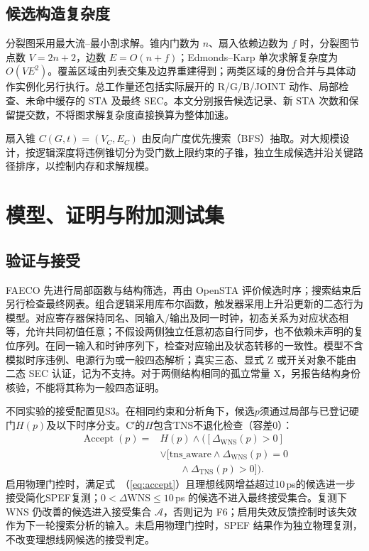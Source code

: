 \documentclass[twocolumn,10pt,fontset=windows]{ctexart}
\renewcommand{\eqref}[1]{\textup{（\ref{#1}）}}
\begin{document}
\subsection{候选构造复杂度}\label{sec:impl}

分裂图采用最大流--最小割求解。锥内门数为 $n$、扇入依赖边数为 $f$ 时，分裂图节点数 $V=2n+2$，边数 $E=O(n+f)$；Edmonds--Karp 单次求解复杂度为 $O(VE^2)$。覆盖区域由列表交集及边界重建得到；两类区域的身份合并与具体动作实例化另行执行。总工作量还包括实际展开的 R/G/B/JOINT 动作、局部检查、未命中缓存的 STA 及最终 SEC。本文分别报告候选记录、新 STA 次数和保留提交数，不将图求解复杂度直接换算为整体加速。

扇入锥 $C(G, t) = (V_C, E_C)$ 由反向广度优先搜索（BFS）抽取。对大规模设计，按逻辑深度将违例锥切分为受门数上限约束的子锥，独立生成候选并沿关键路径排序，以控制内存和求解规模。

\section{模型、证明与附加测试集}\label{sec:exp}
\subsection{验证与接受}\label{sec:validation}
FAECO 先进行局部函数与结构筛选，再由 OpenSTA 评价候选时序；搜索结束后另行检查最终网表。组合逻辑采用库布尔函数，触发器采用上升沿更新的二态行为模型。对应寄存器保持同名、同输入/输出及同一时钟，初态关系为对应状态相等，允许共同初值任意；不假设两侧独立任意初态自行同步，也不依赖未声明的复位序列。在同一输入和时钟序列下，检查对应输出及状态转移的一致性。模型不含模拟时序违例、电源行为或一般四态解析；真实三态、显式 Z 或开关对象不能由二态 SEC 认证，记为不支持。对于两侧结构相同的孤立常量 X，另报告结构身份核验，不能将其称为一般四态证明。

不同实验的接受配置见S3。在相同约束和分析角下，候选$p$须通过局部与已登记硬门$H(p)$及以下时序分支。C′的$H$包含TNS不退化检查（容差0）：
\begin{equation}
\label{eq:accept}
\begin{aligned}
\operatorname{Accept}(p)={}&H(p)\land\bigl([\Delta_{\mathrm{WNS}}(p)>0]\\
&\lor[\mathrm{tns\_aware}\land\Delta_{\mathrm{WNS}}(p)=0\\
&\qquad\land\Delta_{\mathrm{TNS}}(p)>0]\bigr).
\end{aligned}
\end{equation}
启用物理门控时，满足式~\eqref{eq:accept}且理想线网增益超过10\,ps的候选进一步接受简化SPEF复测；$0<\Delta\mathrm{WNS}\le10\,$ps 的候选不进入最终接受集合。复测下 WNS 仍改善的候选进入接受集合 $\mathcal{A}$，否则记为 F6；启用失效反馈控制时该失效作为下一轮搜索分析的输入。未启用物理门控时，SPEF 结果作为独立物理复测，不改变理想线网候选的接受判定。
\end{document}
